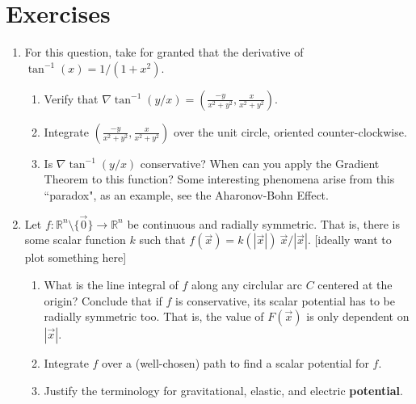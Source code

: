 \documentclass[11pt,openany]{book}
\newcommand*{\exercises}{\section*{\exercisename}}
\newcommand{\exercisename}{Exercises}
\begin{document}
	\exercises
	\begin{enumerate}
		
		\item For this question, take for granted that the derivative of $\tan^{-1}(x) = 1/(1+x^2)$. \begin{enumerate}
			\item Verify that $\nabla \tan^{-1}(y/x) = (\frac{-y}{x^2+y^2}, \frac{x}{x^2+y^2})$.
			\item Integrate $(\frac{-y}{x^2+y^2}, \frac{x}{x^2+y^2})$ over the unit circle, oriented counter-clockwise.
			\item Is $\nabla \tan^{-1}(y/x)$ conservative? When can you apply the Gradient Theorem to this function? Some interesting phenomena arise from this ``paradox", as an example, see the Aharonov-Bohn Effect.
		\end{enumerate}
		\item Let $f:\mathbb{R}^n\setminus\{\vec{0}\} \to\mathbb{R}^n$ be continuous and radially symmetric. That is, there is some scalar function $k$ such that $f(\vec{x})= k(|\vec{x}|) \ \vec{x}/ |\vec{x}|$. [ideally want to plot something here] \begin{enumerate}
			\item What is the line integral of $f$ along any circlular arc $C$ centered at the origin? Conclude that if $f$ is conservative, its scalar potential has to be radially symmetric too. 
			That is, the value of $F(\vec{x})$ is only dependent on $|\vec{x}|$.
			\item Integrate $f$ over a (well-chosen) path to find a scalar potential for $f$.
			\item Justify the terminology for gravitational, elastic, and electric \textbf{potential}.  
		\end{enumerate}
		
	\end{enumerate}
	
\end{document}
